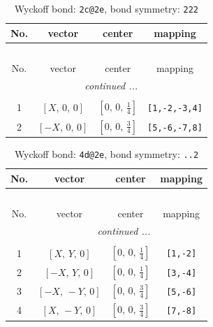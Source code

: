 \documentclass[fleqn,8pt]{jsarticle}
\begin{document}
\begin{longtable}{cccc}
\caption{Wyckoff bond: {\tt 2c@2e}, bond symmetry: {\tt 222}}
 \\
 \hline \hline
No. & vector & center & mapping \\ \hline \endfirsthead

\multicolumn{3}{l}{\tablename\ \thetable{}} \\
 \hline \hline
No. & vector & center & mapping \\ \hline \endhead

 \hline \hline
\multicolumn{3}{r}{\footnotesize\it continued ...} \\ \endfoot

 \hline \hline
\multicolumn{3}{r}{} \\ \endlastfoot

1 & $\left[ X,\, 0,\, 0 \right]$ & $\left[ 0,\, 0,\, \frac{1}{4} \right]$ & {\tt [1,-2,-3,4]} \\ \hline
2 & $\left[ - X,\, 0,\, 0 \right]$ & $\left[ 0,\, 0,\, \frac{3}{4} \right]$ & {\tt [5,-6,-7,8]} \\
\end{longtable}
\renewcommand{\arraystretch}{1.2}
\begin{longtable}{cccc}
\caption{Wyckoff bond: {\tt 4d@2e}, bond symmetry: {\tt ..2}}
 \\
 \hline \hline
No. & vector & center & mapping \\ \hline \endfirsthead

\multicolumn{3}{l}{\tablename\ \thetable{}} \\
 \hline \hline
No. & vector & center & mapping \\ \hline \endhead

 \hline \hline
\multicolumn{3}{r}{\footnotesize\it continued ...} \\ \endfoot

 \hline \hline
\multicolumn{3}{r}{} \\ \endlastfoot

1 & $\left[ X,\, Y,\, 0 \right]$ & $\left[ 0,\, 0,\, \frac{1}{4} \right]$ & {\tt [1,-2]} \\ \hline
2 & $\left[ - X,\, Y,\, 0 \right]$ & $\left[ 0,\, 0,\, \frac{1}{4} \right]$ & {\tt [3,-4]} \\ \hline
3 & $\left[ - X,\, - Y,\, 0 \right]$ & $\left[ 0,\, 0,\, \frac{3}{4} \right]$ & {\tt [5,-6]} \\ \hline
4 & $\left[ X,\, - Y,\, 0 \right]$ & $\left[ 0,\, 0,\, \frac{3}{4} \right]$ & {\tt [7,-8]} \\
\end{longtable}
\end{document}
